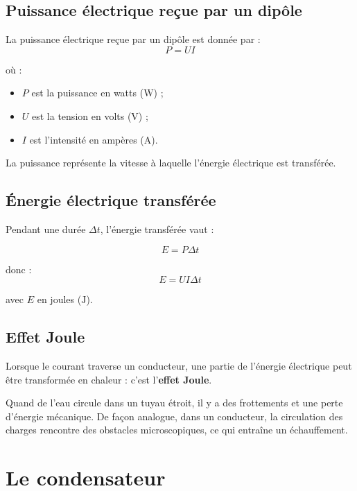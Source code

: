 \documentclass[11pt,a4paper]{article}
\begin{document}
\subsection{Puissance électrique reçue par un dipôle}

\begin{definitionbox}
La puissance électrique reçue par un dipôle est donnée par :
\[
P = UI
\]
\end{definitionbox}

où :
\begin{itemize}
    \item \(P\) est la puissance en watts (\(\text{W}\)) ;
    \item \(U\) est la tension en volts (\(\text{V}\)) ;
    \item \(I\) est l'intensité en ampères (\(\text{A}\)).
\end{itemize}

\begin{interpretation}
La puissance représente la vitesse à laquelle l'énergie électrique est transférée.
\end{interpretation}

\subsection{Énergie électrique transférée}

Pendant une durée \(\Delta t\), l'énergie transférée vaut :

\[
E = P\Delta t
\]

donc :
\[
E = UI\Delta t
\]

avec \(E\) en joules (\(\text{J}\)).

\subsection{Effet Joule}

Lorsque le courant traverse un conducteur, une partie de l'énergie électrique peut être transformée en chaleur : c'est l'\textbf{effet Joule}.

\begin{analogie}
Quand de l'eau circule dans un tuyau étroit, il y a des frottements et une perte d'énergie mécanique. De façon analogue, dans un conducteur, la circulation des charges rencontre des obstacles microscopiques, ce qui entraîne un échauffement.
\end{analogie}

\section{Le condensateur}
\end{document}
